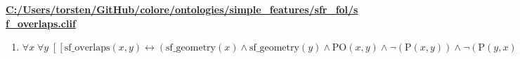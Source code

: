 \documentclass{article}
\begin{document}
\textbf{\url{C:/Users/torsten/GitHub/colore/ontologies/simple\_features/sfr\_fol/sf\_overlaps.clif}}

\begin{enumerate}
\item $\forall x\; \forall y\;  \left[ \left[ \textrm{sf\_overlaps}(x,y) \leftrightarrow \left(\textrm{sf\_geometry}(x) \land \textrm{sf\_geometry}(y) \land \textrm{PO}(x,y) \land \neg \left(\textrm{P}(x,y)\right) \land \neg \left(\textrm{P}(y,x)\right)\right) \right] \right]$
\end{enumerate}
\end{document}
